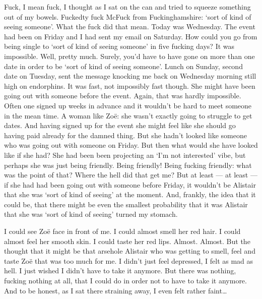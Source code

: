 Fuck, I mean fuck, I thought as I sat on the can and tried to
squeeze something out of my bowels. Fuckedty fuck McFuck from
Fuckinghamshire: `sort of kind of seeing someone'. What the fuck did
that mean. Today was Wednesday. The event had been on Friday and I
had sent my email on Saturday. How could you go from being single to
`sort of kind of seeing someone' in five fucking days? It was
impossible. Well, pretty much. Surely, you'd have to have gone on
more than one date in order to be `sort of kind of seeing someone'.
Lunch on Sunday, second date on Tuesday, sent the message knocking
me back on Wednesday morning still high on endorphins. It was fast,
not impossibly fast though. She might have been going out with
someone before the event. Again, that was hardly impossible. Often
one signed up weeks in advance and it wouldn't be hard to meet
someone in the mean time. A woman like Zoë: she wasn't exactly
going to struggle to get dates. And having signed up for the event
she might feel like she should go having paid already for the damned
thing. But she hadn't looked like someone who was going out with
someone on Friday. But then what would she have looked like if she
had? She had been been projecting an `I'm not interested' vibe, but
perhaps she was just being friendly. Being friendly! Being fucking
friendly: what was the point of that? Where the hell did that get
{\twelveit me\/}? But at least --- {\twelveit at least} --- if she
had had been going out with someone before Friday, it wouldn't be
Alistair that she was `sort of kind of seeing' at the moment. And,
frankly, the idea that it could be, that there might be even the
smallest probability that it was Alistair that she was `sort of kind
of seeing' turned my stomach.

I could see Zoë face in front of me. I could almost smell her
red hair. I could almost feel her smooth skin. I could taste her red
lips. Almost. Almost. But the thought that it might be that arsehole
Alistair who was getting to smell, feel and taste Zoë that was
too much for me. I didn't just feel depressed, I felt as mad as
hell. I just wished I didn't have to take it anymore. But there was
nothing, fucking nothing at all, that I could do in order not to
have to take it anymore. And to be honest, as I sat there straining
away, I even felt rather faint\dots

